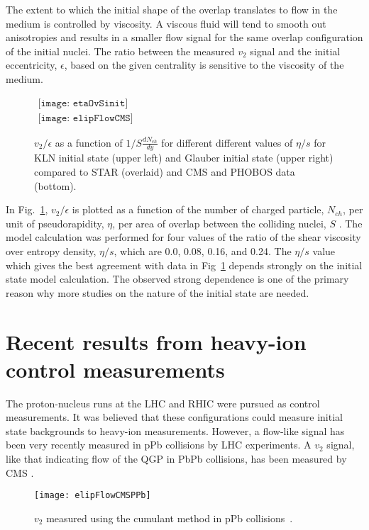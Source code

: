     The extent to which the initial shape of the overlap translates to flow
      in the medium is controlled by viscosity. 
    A viscous fluid will tend to smooth out anisotropies and results in 
      a smaller flow signal for the same overlap configuration of the initial
      nuclei. 
    The ratio between the measured $v_{2}$ signal and the initial 
      eccentricity, $\epsilon$, based on the given centrality is sensitive
      to the viscosity of the medium. 

    \begin{figure}[!Hhbt]
      \centering
      $ \begin{array}{cc}
        \texttt{[image: etaOvSinit]} \\
        \texttt{[image: elipFlowCMS]}
      \end{array} $
      \caption{$v_{2}/\epsilon$  as a function of $1/S \frac{dN_{ch}}{dy}$
        for different different values of $\eta/s$ for KLN initial state 
        (upper left) and Glauber initial state (upper right) compared to STAR (overlaid)
        and CMS and PHOBOS data (bottom).}
      \label{fig:elipFlow}
    \end{figure}

    In Fig.~\ref{fig:elipFlow}, $v_{2}/\epsilon$ is plotted as a function of 
      the number of charged particle, $N_{ch}$, per unit of pseudorapidity, 
      $\eta$, per area of overlap between the colliding nuclei, 
      $S$ \cite{etaOvSinit}. 
    The model calculation was performed for four values of the ratio of the 
      shear viscosity over entropy density, $\eta/s$, which are 
      0.0, 0.08, 0.16, and 0.24.
    The $\eta/s$ value which gives the best agreement with data in 
      Fig~\ref{fig:elipFlow} depends strongly on the initial state model 
      calculation.
    The observed strong dependence is one of the primary reason
      why more studies on the nature of the initial state are needed. 
    
  \section{Recent results from heavy-ion control measurements}
    The proton-nucleus runs at the LHC and RHIC were pursued as
      control measurements. 
    It was believed that these configurations could measure 
      initial state backgrounds to heavy-ion measurements.
    However, a flow-like signal has been very recently measured in pPb 
      collisions by LHC experiments.
    A $v_{2}$ signal, like that indicating flow of the QGP in PbPb collisions,
      has been measured by CMS \cite{Chatrchyan:2013nka}.
    \begin{figure}[!Hhbt]
      \centering
      \texttt{[image: elipFlowCMSPPb]}
      \caption{$v_{2}$ measured using the cumulant method in pPb collisions~\cite{Chatrchyan:2013nka}.}
      \label{fig:pPbFlow}
    \end{figure}

